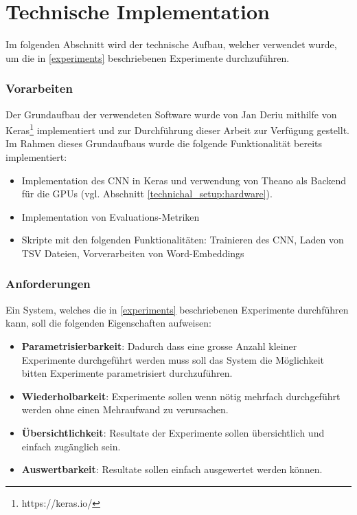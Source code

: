 \section{Technische Implementation}
Im folgenden Abschnitt wird der technische Aufbau, welcher verwendet wurde, um die in \ref{experiments} beschriebenen Experimente durchzuführen.

\subsubsection{Vorarbeiten}
\label{technichal_setup:prework}
Der Grundaufbau der verwendeten Software wurde von Jan Deriu mithilfe von Keras\footnote{https://keras.io/} implementiert und zur Durchführung dieser Arbeit zur Verfügung gestellt. Im Rahmen dieses Grundaufbaus wurde die folgende Funktionalität bereits implementiert:

\begin{itemize}[noitemsep]
	\item Implementation des CNN in Keras und verwendung von Theano \cite{theanoCitShort} als Backend für die GPUs (vgl. Abschnitt \ref{technichal_setup:hardware}).
	\item Implementation von Evaluations-Metriken
	\item Skripte mit den folgenden Funktionalitäten: Trainieren des CNN, Laden von TSV Dateien, Vorverarbeiten von Word-Embeddings
\end{itemize}

\subsubsection{Anforderungen}
\label{technical_setup:requirements}
Ein System, welches die in \ref{experiments} beschriebenen Experimente durchführen kann, soll die folgenden Eigenschaften aufweisen:

\begin{itemize}
	\item \textbf{Parametrisierbarkeit}: Dadurch dass eine grosse Anzahl kleiner Experimente durchgeführt werden muss soll das System die Möglichkeit bitten Experimente parametrisiert durchzuführen.
	\item \textbf{Wiederholbarkeit}: Experimente sollen wenn nötig mehrfach durchgeführt werden ohne einen Mehraufwand zu verursachen. 
	\item \textbf{Übersichtlichkeit}: Resultate der Experimente sollen übersichtlich und einfach zugänglich sein.
	\item \textbf{Auswertbarkeit}: Resultate sollen  einfach ausgewertet werden können.
\end{itemize}

